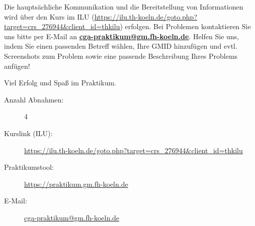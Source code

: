 \documentclass{CG2}
\newcommand{\tldr}[2]{
	\vspace{.3cm}
	\begin{tcolorbox}[enhanced jigsaw,breakable,pad at break*=1mm,
  	colback=thmagenta!5!white,colframe=thmagenta!80!black,title=\textsf{#1}]
  	{\normalsize #2}
	\end{tcolorbox}}{\par \bigskip}
\begin{document}
Die hauptsächliche Kommunikation und die Bereitstellung von Informationen wird über den Kurs im ILU (\url{https://ilu.th-koeln.de/goto.php?target=crs_276944&client_id=thkilu}) erfolgen. Bei Problemen kontaktieren Sie uns bitte per E-Mail an \textbf{\href{mailto:cga-praktikum@gm.fh-koeln.de}{cga-praktikum@gm.fh-koeln.de}}. Helfen Sie uns, indem Sie einen passenden Betreff wählen, Ihre GMID hinzufügen und evtl. Screenshots zum Problem sowie eine passende Beschreibung Ihres Problems anfügen!



\vspace{1cm}
\centering
\LARGE Viel Erfolg und Spaß im Praktikum. 

\vspace{2cm}
\tldr{tl;dr}{\begin{description}
	\item[Anzahl Abnahmen:] 4
	\item[Kurslink (ILU):] \url{https://ilu.th-koeln.de/goto.php?target=crs_276944&client_id=thkilu}
	\item[Praktikumstool:] \url{https://praktikum.gm.fh-koeln.de}
	\item[E-Mail:] \href{mailto:cga-praktikum@gm.fh-koeln.de}{cga-praktikum@gm.fh-koeln.de}
\end{description}
}
\end{document}
